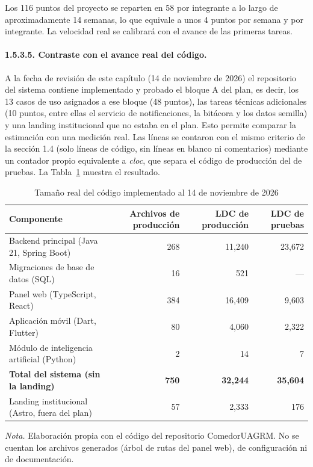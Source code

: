 Los 116 puntos del proyecto se reparten en 58 por integrante a lo largo de aproximadamente 14 semanas, lo que equivale a unos 4 puntos por semana y por integrante. La velocidad real se calibrará con el avance de las primeras tareas.

\paragraph{1.5.3.5. Contraste con el avance real del código.}

A la fecha de revisión de este capítulo (14 de noviembre de 2026) el repositorio del sistema contiene implementado y probado el bloque A del plan, es decir, los 13 casos de uso asignados a ese bloque (48 puntos), las tareas técnicas adicionales (10 puntos, entre ellas el servicio de notificaciones, la bitácora y los datos semilla) y una landing institucional que no estaba en el plan. Esto permite comparar la estimación con una medición real. Las líneas se contaron con el mismo criterio de la sección 1.4 (solo líneas de código, sin líneas en blanco ni comentarios) mediante un contador propio equivalente a \textit{cloc}, que separa el código de producción del de pruebas. La Tabla~\ref{tab:tamano_real} muestra el resultado.

\begin{table}[H]
\caption{Tamaño real del código implementado al 14 de noviembre de 2026}
\label{tab:tamano_real}
\begin{threeparttable}
\begin{tabular}{>{\raggedright\arraybackslash}p{5.6cm} r r r}
\toprule
Componente & Archivos de producción & LDC de producción & LDC de pruebas \\
\midrule
Backend principal (Java 21, Spring Boot) & 268 & 11,240 & 23,672 \\
Migraciones de base de datos (SQL) & 16 & 521 & --- \\
Panel web (TypeScript, React) & 384 & 16,409 & 9,603 \\
Aplicación móvil (Dart, Flutter) & 80 & 4,060 & 2,322 \\
Módulo de inteligencia artificial (Python) & 2 & 14 & 7 \\
\midrule
\textbf{Total del sistema (sin la landing)} & \textbf{750} & \textbf{32,244} & \textbf{35,604} \\
Landing institucional (Astro, fuera del plan) & 57 & 2,333 & 176 \\
\bottomrule
\end{tabular}
\begin{tablenotes}
\item \textit{Nota.} Elaboración propia con el código del repositorio ComedorUAGRM. No se cuentan los archivos generados (árbol de rutas del panel web), de configuración ni de documentación.
\end{tablenotes}
\end{threeparttable}
\end{table}

